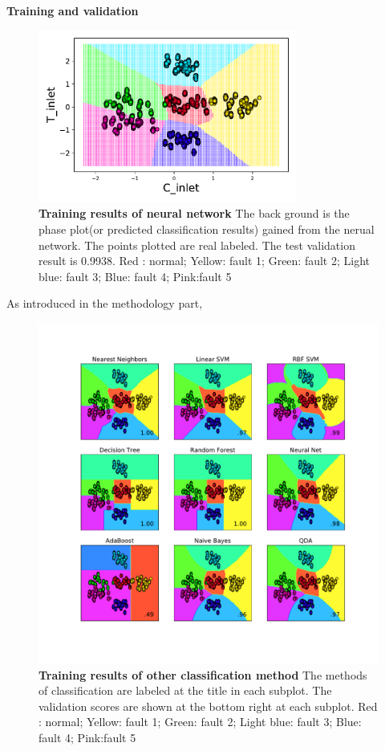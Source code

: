 \documentclass[fleqn,11pt]{wlscirep}
\begin{document}
\textbf{Training and validation}
\begin{figure}[h]
    \centering
    \includegraphics[width=8.5cm]{figure5.pdf}
    \caption{
    \textbf{Training results of neural network} The back ground is the phase plot(or predicted classification results) gained from the nerual network. The points plotted are real labeled. The test validation result is 0.9938.  Red : normal; Yellow: fault 1; Green: fault 2; Light blue: fault 3;  Blue: fault 4; Pink:fault 5 }
    \label{fig:1}
\end{figure}
As introduced in the methodology part,
\begin{figure}[h]
    \centering
    \includegraphics[width=12cm]{figure6.pdf}
    \caption{
    \textbf{Training results of other classification method} The methods of classification are labeled at the title in each subplot. The validation scores are shown at the bottom right at each subplot.  Red : normal; Yellow: fault 1; Green: fault 2; Light blue: fault 3;  Blue: fault 4; Pink:fault 5 }
    \label{fig:1}
\end{figure}
\end{document}
